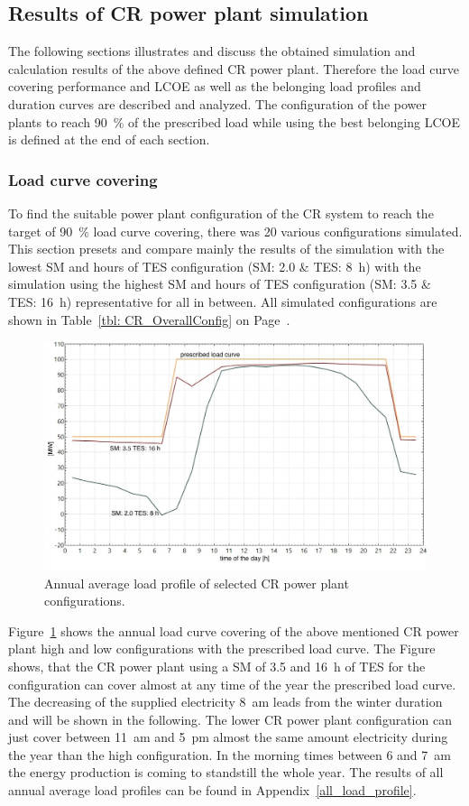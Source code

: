 \subsection{Results of CR power plant simulation}
The following sections illustrates and discuss the obtained simulation and calculation results of the above defined CR power plant. Therefore the load curve covering performance and LCOE as well as the belonging load profiles and duration curves are described and analyzed. The configuration of the power plants to reach 90~\% of the prescribed load while using the best belonging LCOE is defined at the end of each section.
\subsubsection{Load curve covering}
To find the suitable power plant configuration of the CR system to reach the target of 90~\% load curve covering, there was 20 various configurations simulated. This section presets and compare mainly the results of the simulation with the lowest SM and hours of TES configuration (SM: 2.0 \& TES: 8~h) with the simulation using the highest SM and hours of TES configuration (SM: 3.5 \& TES: 16~h) representative for all in between. All simulated configurations are shown in Table~\ref{tbl: CR_OverallConfig} on Page~\pageref{tbl: CR_OverallConfig}.

\begin{figure}[htbp]  
\centering
\includegraphics[width=0.8\linewidth]{FIG/CR_annual_profil}
\caption[Annual average load profile of selected CR power plant configurations.]{Annual average load profile of selected CR power plant configurations.}\label{CR_annual_profil}
\end{figure}
Figure~\ref{CR_annual_profil} shows the annual load curve covering of the above mentioned CR power plant high and low configurations with the prescribed load curve. The Figure shows, that the CR power plant using a SM of 3.5 and 16~h of TES for the configuration can cover almost at any time of the year the prescribed load curve. The decreasing of the supplied electricity 8~am leads from the winter duration and will be shown in the following. The lower CR power plant configuration can just cover between 11~am and 5~pm almost the same amount electricity during the year than the high configuration. In the morning times between 6 and 7~am the energy production is coming to standstill the whole year. The results of all annual average load profiles can be found in Appendix~\ref{all_load_profile}.

